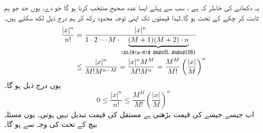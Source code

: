 یہ دکھانے کی خاطر کہ  ہے ، سب سے پہلے  ایسا عدد صحیح   منتخب کرنا ہو گا   جو  دے۔  یوں حد  جو ہم ثابت کر چکے کے تحت  ہو گا۔لہٰذا    قیمتوں تک اپنی توجہ محدود رکھ کر ہم   درج ذیل لکھ سکتے ہیں۔
\begin{align*}
\frac{|x|^n}{n!}&=\frac{|x|^n}{1\cdot 2\cdots M\cdot \underbrace{(M+1)(M+2)\cdot n}_{\text{\RL{$(n-M)$ جزو ضربی}}}}\\
&\le \frac{|x|^n}{M!M^{n-M}}=\frac{|x|^n M^M}{M!M^n}=\frac{M^M}{M!}\left(\frac{|x|}{M}\right)^n
\end{align*}
یوں درج ذیل ہو گا۔
\[0\le \frac{|x|^n}{n!}\le \frac{M^M}{M!}\left(\frac{|x|}{M}\right)^n\]
اب جیسے جیسے  کی قیمت بڑھتی ہے مستقل  کی قیمت تبدیل نہیں ہوتی۔ یوں مسئلہ بیچ کے تحت  کی وجہ سے  ہو گا۔
